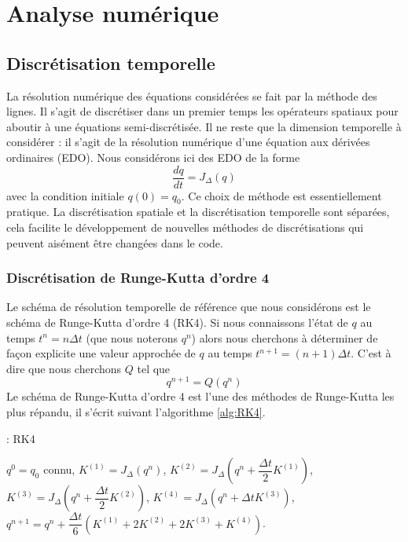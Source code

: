\chapter{Analyse numérique}
\label{chap:2}

\section{Discrétisation temporelle}

La résolution numérique des équations considérées se fait par la méthode des lignes. Il s'agit de discrétiser dans un premier temps les opérateurs spatiaux pour aboutir à une équations semi-discrétisée. Il ne reste que la dimension temporelle à considérer : il s'agit de la résolution numérique d'une équation aux dérivées ordinaires (EDO). Nous considérons ici des EDO de la forme
\begin{equation}
\dfrac{d q}{dt} = J_{\Delta} (q)
\label{eq:edo}
\end{equation}
avec la condition initiale $q(0)=q_0$. 
Ce choix de méthode est essentiellement pratique. La discrétisation spatiale et la discrétisation temporelle sont séparées, cela facilite le développement de nouvelles méthodes de discrétisations qui peuvent aisément être changées dans le code.

\subsection{Discrétisation de Runge-Kutta d'ordre 4}

Le schéma de résolution temporelle de référence que nous considérons est le schéma de Runge-Kutta d'ordre 4 (RK4). Si nous connaissons l'état de $q$ au temps $t^n = n \Delta t$ (que nous noterons $q^n$) alors nous cherchons à déterminer de façon explicite une valeur approchée de $q$ au temps $t^{n+1} = (n+1) \Delta t$. C'est à dire que nous cherchons $Q$ tel que
\begin{equation}
q^{n+1} = Q(q^n)
\end{equation}
Le schéma de Runge-Kutta d'ordre 4 est l'une des méthodes de Runge-Kutta les plus répandu, il s'écrit suivant l'algorithme \ref{alg:RK4}.

\begin{center}
\begin{minipage}[H]{12cm}
  \begin{algorithm}[H]
    \caption{: RK4}\label{alg:RK4}
    \begin{algorithmic}[1]
    \State $q^0 = q_0$ connu,
             \State  $K^{(1)} = J_{\Delta} \left( q^n \right)$,
             \State  $K^{(2)} = J_{\Delta} \left( q^n + \dfrac{\Delta t}{2} K^{(1)}\right)$,
             \State  $K^{(3)} = J_{\Delta} \left( q^n + \dfrac{\Delta t}{2} K^{(2)}\right)$,
             \State  $K^{(4)} = J_{\Delta} \left( q^n + \Delta t K^{(3)}\right)$,  
             \State  $q^{n+1} = q^n  + \dfrac{\Delta t}{6} \left( K^{(1)} + 2 K^{(2)} + 2 K^{(3)} + K^{(4)} \right)$.
            \EndFor
    \end{algorithmic}
    \end{algorithm}
\end{minipage}
\end{center}

